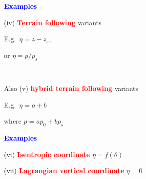 \documentclass[a4]{seminar}
\newcommand{\R}[1]{\textcolor{red}{#1}}
\newcommand{\B}[1]{\textcolor{blue}{#1}}
\begin{document}

\begin{slide}

\B{\bf Examples}

\vspace{2mm}

\begin{minipage}{50mm}
(iv) \R{\bf Terrain following} variants

E.g.\ \( \eta = z - z_s\),

or \( \eta = p/p_s \)
\end{minipage}
\ \ \ \ \ \ \ \ \ 
\begin{minipage}{50mm}
Also (v) \R{\bf hybrid terrain following} variants

E.g.\ \( \eta = a + b \)

where \( p = a p_0 + b p_s \) 
\end{minipage}

\begin{center}
\end{center}



\end{slide}


\begin{slide}

\B{\bf Examples}

\vspace{6mm}

(vi) \R{\bf Isentropic coordinate} \( \eta = f(\theta) \)

\vspace{3mm}

(vii) \R{\bf Lagrangian vertical coordinate} \( \dot{\eta} = 0 \)

\vspace{3mm}


\end{slide}

\end{document}
